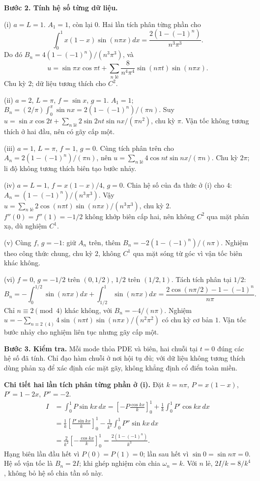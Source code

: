 \textbf{Bước 2. Tính hệ số từng dữ liệu.}

(i) $a=L=1$. $A_1=1$, còn lại $0$. Hai lần tích phân từng phần cho
\[\int_0^1x(1-x)\sin(n\pi x)dx=\frac{2(1-(-1)^n)}{n^3\pi^3}.\]
Do đó $B_n=4(1-(-1)^n)/(n^3\pi^3)$, và
\[u=\sin\pi x\cos\pi t+\sum_{n\text{ lẻ}}\frac8{n^4\pi^4}\sin(n\pi t)\sin(n\pi x).\]
Chu kỳ $2$; dữ liệu tương thích cho $C^2$.

(ii) $a=2$, $L=\pi$, $f=\sin x$, $g=1$. $A_1=1$; $B_n=(2/\pi)\int_0^\pi\sin nx=2(1-(-1)^n)/(\pi n)$. Suy $u=\sin x\cos2t+\sum_{n\text{ lẻ}}2\sin2nt\sin nx/(\pi n^2)$, chu kỳ $\pi$. Vận tốc không tương thích ở hai đầu, nên có gãy cấp một.

(iii) $a=1$, $L=\pi$, $f=1$, $g=0$. Cùng tích phân trên cho $A_n=2(1-(-1)^n)/(\pi n)$, nên $u=\sum_{n\text{ lẻ}}4\cos nt\sin nx/(\pi n)$. Chu kỳ $2\pi$; li độ không tương thích biên tạo bước nhảy.

(iv) $a=L=1$, $f=x(1-x)/4$, $g=0$. Chia hệ số của đa thức ở (i) cho $4$: $A_n=(1-(-1)^n)/(n^3\pi^3)$. Vậy $u=\sum_{n\text{ lẻ}}2\cos(n\pi t)\sin(n\pi x)/(n^3\pi^3)$, chu kỳ $2$. $f''(0)=f''(1)=-1/2$ không khớp biên cấp hai, nên không $C^2$ qua mặt phản xạ, dù nghiệm $C^1$.

(v) Cùng $f$, $g=-1$: giữ $A_n$ trên, thêm $B_n=-2(1-(-1)^n)/(n\pi)$. Nghiệm theo công thức chung, chu kỳ $2$, không $C^1$ qua mặt sóng từ góc vì vận tốc biên khác không.

(vi) $f=0$, $g=-1/2$ trên $(0,1/2)$, $1/2$ trên $(1/2,1)$. Tách tích phân tại $1/2$:
\[B_n=-\int_0^{1/2}\sin(n\pi x)dx+\int_{1/2}^1\sin(n\pi x)dx
=\frac{2\cos(n\pi/2)-1-(-1)^n}{n\pi}.\]
Chỉ $n\equiv2\pmod4$ khác không, với $B_n=-4/(n\pi)$. Nghiệm $u=-\sum_{n\equiv2\ (4)}4\sin(n\pi t)\sin(n\pi x)/(n^2\pi^2)$ có chu kỳ cơ bản $1$. Vận tốc bước nhảy cho nghiệm liên tục nhưng gãy cấp một.

\textbf{Bước 3. Kiểm tra.} Mỗi mode thỏa PDE và biên, hai chuỗi tại $t=0$ đúng các hệ số đã tính. Chỉ đạo hàm chuỗi ở nơi hội tụ đủ; với dữ liệu không tương thích dùng phản xạ để xác định các mặt gãy, không khẳng định cổ điển toàn miền.

\textbf{Chi tiết hai lần tích phân từng phần ở (i).} Đặt $k=n\pi$, $P=x(1-x)$, $P'=1-2x$, $P''=-2$.
\[\begin{aligned}
I&=\int_0^1P\sin kx\,dx
=\left[-P\frac{\cos kx}{k}\right]_0^1+\frac1k\int_0^1P'\cos kx\,dx\\
&=\frac1k\left[\frac{P'\sin kx}{k}\right]_0^1-\frac1{k^2}\int_0^1P''\sin kx\,dx\\
&=\frac2{k^2}\left[-\frac{\cos kx}{k}\right]_0^1=\frac{2(1-(-1)^n)}{k^3}.
\end{aligned}\]
Hạng biên lần đầu hết vì $P(0)=P(1)=0$; lần sau hết vì $\sin0=\sin n\pi=0$. Hệ số vận tốc là $B_n=2I$; khi ghép nghiệm còn chia $\omega_n=k$. Với $n$ lẻ, $2I/k=8/k^4$, không bỏ hệ số chia tần số này.

